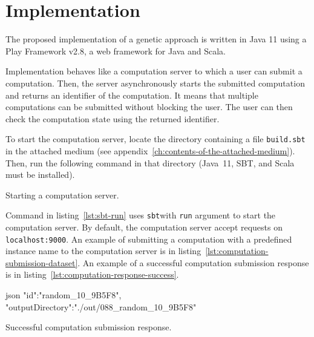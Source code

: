\clearpage%
\newpage


\section{Implementation}\label{sec:implementation}

The proposed implementation of a genetic approach is written in Java 11
using a Play Framework v2.8\footnotemark[1], a web framework for Java and Scala.

Implementation behaves like a computation server to which
a user can submit a computation.
Then, the server asynchronously starts the submitted computation and returns an identifier of the computation.
It means that multiple computations can be submitted without blocking the user.
The user can then check the computation state using the returned identifier.

To start the computation server, locate the directory containing a file \verb|build.sbt| in the attached medium (see appendix~\ref{ch:contents-of-the-attached-medium}).
Then, run the following command in that directory (Java~11, SBT\footnotemark[3], and Scala must be installed).

\begin{listing}[h!]
    \caption[Starting a computation server]
    {Starting a computation server.}
    \label{lst:sbt-run}
\end{listing}

Command in listing~\ref{lst:sbt-run} uses \verb|sbt|\footnotemark[3] with \verb|run| argument to start the computation server.
By default, the computation server accept requests on \verb|localhost:9000|.
An example of submitting a computation with a predefined instance name to the computation server is in listing~\ref{lst:computation-submission-dataset}.
An example of a successful computation submission response is in listing~\ref{lst:computation-response-success}.

\begin{listing}[h!]
    \begin{cminted}[autogobble,breaklines=true]{json}
    {
        "id":"random_10_9B5F8",
        "outputDirectory":"./out/088_random_10_9B5F8"
    }
    \end{cminted}
    \caption[Successful computation submission response]
    {Successful computation submission response.}
    \label{lst:computation-response-success}
\end{listing}

